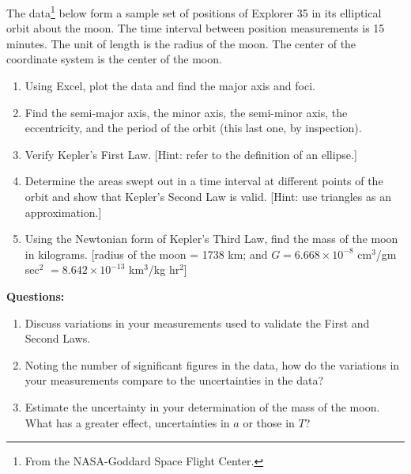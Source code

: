 \noindent The data\footnote{From the NASA-Goddard Space Flight Center.} below form a sample set of positions of Explorer 35 in its elliptical orbit about the moon. The time interval between position measurements is 15 minutes. The unit of length is the radius of the moon. The center of the coordinate system is the center of the moon. 

\begin{enumerate}

\item Using Excel, plot the data and find the major axis and foci.

\item Find the semi-major axis, the minor axis, the semi-minor axis, the eccentricity, and the period of the orbit (this last one, by inspection).

\vskip35pt

\item Verify Kepler's First Law. [Hint: refer to the definition of an ellipse.]

\vskip35pt

\item Determine the areas swept out in a time interval at different points of the orbit and show that Kepler's Second Law is valid. [Hint: use triangles as an approximation.]

\vskip35pt

\item Using the Newtonian form of Kepler's Third Law, find the mass of the moon in kilograms. [radius of the moon = 1738 km; and $G = 6.668 \times 10^{-8}$ cm$^3$/gm sec$^2$ $= 8.642 \times 10^{-13}$ km$^3$/kg hr$^2$]

\end{enumerate}

\vfill \pagebreak 

\textbf{Questions:} 

\begin{enumerate}
\item Discuss variations in your measurements used to validate the First and Second
Laws.\vspace{30mm}

\item Noting the number of significant figures in the data, how do the variations
in your measurements compare to the uncertainties in the data?\vspace{30mm}

\item Estimate the uncertainty in your determination of the mass of the moon. What
has a greater effect, uncertainties in \( a \) or those in \( T \)?
\end{enumerate}
\vfill \pagebreak


